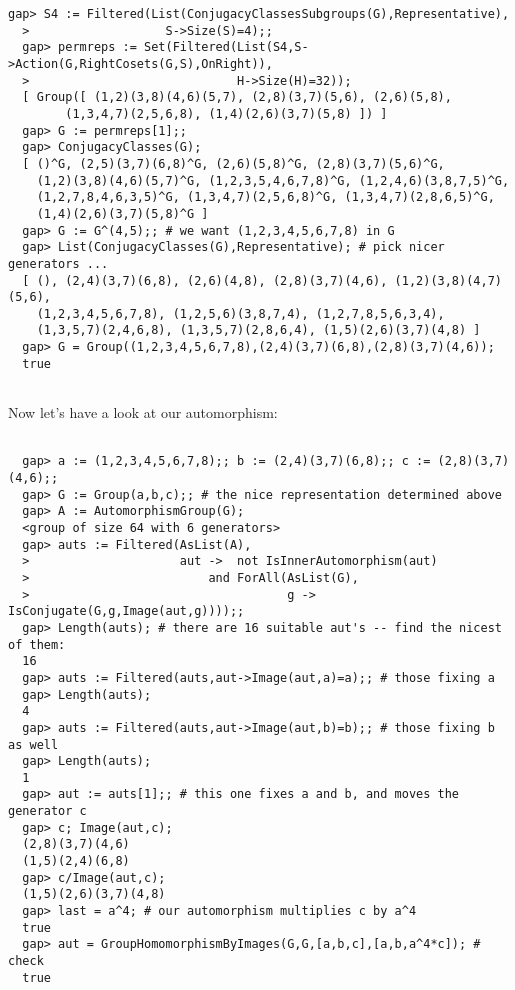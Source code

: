\documentclass[a4paper,11pt]{report}
\begin{document}
{{\begin{Verbatim}[fontsize=\small,frame=single,label=GAP session log]
  gap> S4 := Filtered(List(ConjugacyClassesSubgroups(G),Representative),
  >                   S->Size(S)=4);;
  gap> permreps := Set(Filtered(List(S4,S->Action(G,RightCosets(G,S),OnRight)),
  >                             H->Size(H)=32));
  [ Group([ (1,2)(3,8)(4,6)(5,7), (2,8)(3,7)(5,6), (2,6)(5,8),
        (1,3,4,7)(2,5,6,8), (1,4)(2,6)(3,7)(5,8) ]) ]
  gap> G := permreps[1];;
  gap> ConjugacyClasses(G);
  [ ()^G, (2,5)(3,7)(6,8)^G, (2,6)(5,8)^G, (2,8)(3,7)(5,6)^G, 
    (1,2)(3,8)(4,6)(5,7)^G, (1,2,3,5,4,6,7,8)^G, (1,2,4,6)(3,8,7,5)^G, 
    (1,2,7,8,4,6,3,5)^G, (1,3,4,7)(2,5,6,8)^G, (1,3,4,7)(2,8,6,5)^G, 
    (1,4)(2,6)(3,7)(5,8)^G ]
  gap> G := G^(4,5);; # we want (1,2,3,4,5,6,7,8) in G
  gap> List(ConjugacyClasses(G),Representative); # pick nicer generators ...
  [ (), (2,4)(3,7)(6,8), (2,6)(4,8), (2,8)(3,7)(4,6), (1,2)(3,8)(4,7)(5,6),
    (1,2,3,4,5,6,7,8), (1,2,5,6)(3,8,7,4), (1,2,7,8,5,6,3,4),
    (1,3,5,7)(2,4,6,8), (1,3,5,7)(2,8,6,4), (1,5)(2,6)(3,7)(4,8) ]
  gap> G = Group((1,2,3,4,5,6,7,8),(2,4)(3,7)(6,8),(2,8)(3,7)(4,6));
  true
  
\end{Verbatim}
 Now let's have a look at our automorphism:        
\begin{Verbatim}[fontsize=\small,frame=single,label=GAP session log]
  
  gap> a := (1,2,3,4,5,6,7,8);; b := (2,4)(3,7)(6,8);; c := (2,8)(3,7)(4,6);;
  gap> G := Group(a,b,c);; # the nice representation determined above
  gap> A := AutomorphismGroup(G);
  <group of size 64 with 6 generators>
  gap> auts := Filtered(AsList(A),
  >                     aut ->  not IsInnerAutomorphism(aut)
  >                         and ForAll(AsList(G),
  >                                    g -> IsConjugate(G,g,Image(aut,g))));;
  gap> Length(auts); # there are 16 suitable aut's -- find the nicest of them:
  16
  gap> auts := Filtered(auts,aut->Image(aut,a)=a);; # those fixing a
  gap> Length(auts);
  4
  gap> auts := Filtered(auts,aut->Image(aut,b)=b);; # those fixing b as well
  gap> Length(auts);
  1
  gap> aut := auts[1];; # this one fixes a and b, and moves the generator c
  gap> c; Image(aut,c);
  (2,8)(3,7)(4,6)
  (1,5)(2,4)(6,8)
  gap> c/Image(aut,c);
  (1,5)(2,6)(3,7)(4,8)
  gap> last = a^4; # our automorphism multiplies c by a^4
  true
  gap> aut = GroupHomomorphismByImages(G,G,[a,b,c],[a,b,a^4*c]); # check
  true
  

\end{Verbatim}}}
\end{document}
